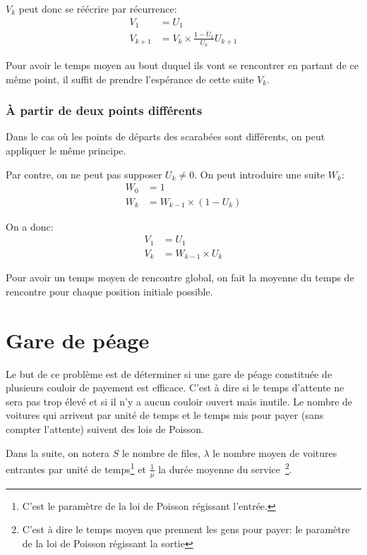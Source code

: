 \documentclass{scrartcl}
\begin{document}
      $V_k$ peut donc se réécrire par récurrence:
        \begin{align*}
          V_1       &= U_1 \\
          V_{k + 1} &= V_k \times \frac{1 - U_k}{U_k}U_{k + 1}
        \end{align*}

      Pour avoir le temps moyen au bout duquel ils vont se rencontrer en
      partant de ce même point, il suffit de prendre l'espérance de cette suite
      $V_k$.

    \subsubsection{À partir de deux points différents}
      Dans le cas où les points de départs des scarabées sont différents, on peut
      appliquer le même principe.

      Par contre, on ne peut pas supposer $U_k \neq 0$.
      On peut introduire une suite $W_k$:
      \begin{align*}
        W_0 &= 1 \\
        W_k &= W_{k-1} \times (1 - U_k)
      \end{align*}

      On a donc:
      \begin{align*}
        V_1  &= U_1 \\
        V_k &= W_{k-1} \times U_k
      \end{align*}

      Pour avoir un temps moyen de rencontre global, on fait la moyenne du temps
      de rencontre pour chaque position initiale possible.

\section{Gare de péage}
  Le but de ce problème est de déterminer si une gare de péage constituée de
  plusieurs couloir de payement est efficace. C'est à dire si le temps
  d'attente ne sera pas trop élevé et si il n'y a aucun couloir ouvert mais
  inutile. Le nombre de voitures qui arrivent par unité de temps et le temps
  mis pour payer (sans compter l'attente) suivent des lois de Poisson.

  Dans la suite, on notera $S$ le nombre de files, $\lambda$ le nombre moyen de
  voitures entrantes par unité de temps\footnote{C'est le paramètre de la loi
  de Poisson régissant l'entrée.} et $\frac 1 \mu$ la durée moyenne du
  service~\footnote{C'est à dire le temps moyen que prennent les gens pour
  payer: le paramètre de la loi de Poisson régissant la sortie}.
\end{document}
